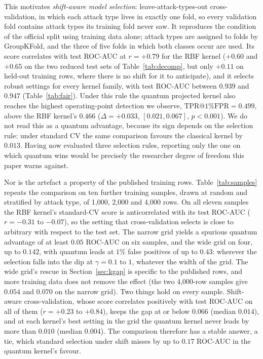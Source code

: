 \documentclass[preprint,11pt]{elsarticle}
\newcommand{\tpr}{\mathrm{TPR}}
\newcommand{\fpr}{\mathrm{FPR}}
\begin{document}
This motivates \emph{shift-aware model selection}: leave-attack-types-out cross-validation, in which each
attack type lives in exactly one fold, so every validation fold contains attack types its training fold
never saw. It reproduces the condition of the official split using training data alone; attack types
are assigned to folds by GroupKFold, and the three of five folds in which both classes occur are used.
Its score correlates with test ROC-AUC at $r=+0.79$ for the RBF kernel ($+0.60$ and $+0.65$ on the two
reduced test sets of Table~\ref{tab:decomp}, but only $+0.11$ on held-out training rows, where there is no
shift for it to anticipate), and it selects robust settings for every
kernel family, with test ROC-AUC between $0.939$ and $0.947$ (Table~\ref{tab:fair}). Under this rule the
quantum projected kernel also reaches the highest operating-point detection we observe,
$\tpr$@$1\%\fpr=0.499$, above the RBF kernel's $0.466$ ($\Delta=+0.033$, $[0.021,0.067]$, $p<0.001$). We do
not read this as a quantum advantage, because its sign depends on the selection rule: under standard CV
the same comparison favours the classical kernel by $0.013$. Having now evaluated three selection rules,
reporting only the one on which quantum wins would be precisely the researcher degree of freedom this
paper warns against.

Nor is the artefact a property of the published training rows. Table~\ref{tab:samples} repeats the
comparison on ten further training samples, drawn at random and stratified by attack type, of 1{,}000,
2{,}000 and 4{,}000 rows. On all eleven samples the RBF kernel's standard-CV score is anticorrelated with
its test ROC-AUC ($r=-0.31$ to $-0.07$), so the setting that cross-validation selects is close to
arbitrary with respect to the test set. The narrow grid yields a spurious quantum advantage of at least
$0.05$ ROC-AUC on six samples, and the wide grid on four, up to $0.142$, with quantum leads at $1\%$ false
positives of up to $0.43$: wherever the selection falls into the dip at $\gamma=0.1$ to $1$, whatever the
width of the grid. The wide grid's rescue in Section~\ref{sec:kgap} is specific to the published rows, and
more training data does not remove the effect (the two 4{,}000-row samples give $0.054$ and $0.070$ on the
narrow grid). Two things hold on every sample. Shift-aware cross-validation, whose score correlates
positively with test ROC-AUC on all of them ($r=+0.23$ to $+0.84$), keeps the gap at or below $0.066$
(median $0.014$), and at each kernel's best setting in the grid the quantum kernel never leads by more than
$0.010$ (median $0.004$). The comparison therefore has a stable answer, a tie, which standard selection
under shift misses by up to $0.17$ ROC-AUC in the quantum kernel's favour.
\end{document}

